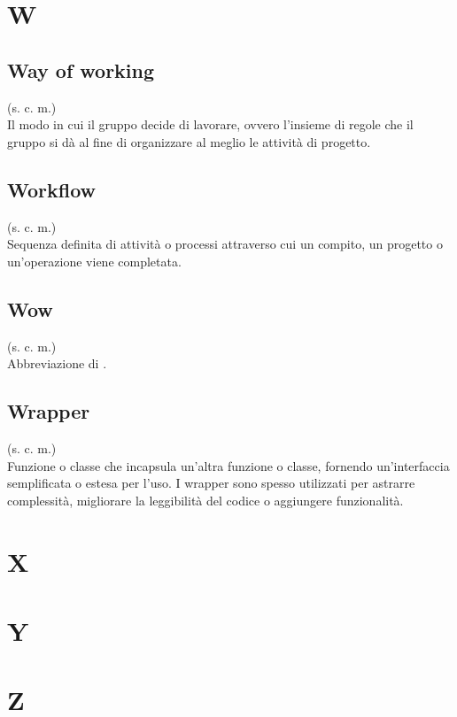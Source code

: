 \section{W}
\subsection{Way of working}
\label{Way of working}
(s. c. m.)\\
Il modo in cui il gruppo decide di lavorare, ovvero l'insieme di regole
che il gruppo si dà al fine di organizzare al meglio le attività di progetto.
\subsection{Workflow}
(s. c. m.)\\
Sequenza definita di attività o processi attraverso cui un compito, un progetto
o un'operazione viene completata.
\subsection{Wow}
(s. c. m.)\\
Abbreviazione di .
\subsection{Wrapper}
(s. c. m.)\\
Funzione o classe che incapsula un'altra funzione o classe, fornendo un'interfaccia
semplificata o estesa per l'uso. I wrapper sono spesso utilizzati per
astrarre complessità, migliorare la leggibilità del codice o aggiungere funzionalità.
\pagebreak
\section{X}
\pagebreak
\section{Y}
\pagebreak
\section{Z}
